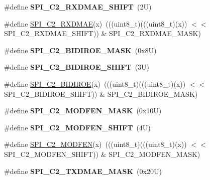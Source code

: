 \begin{DoxyCompactItemize}
\#define {\bfseries S\+P\+I\+\_\+\+C2\+\_\+\+R\+X\+D\+M\+A\+E\+\_\+\+S\+H\+I\+FT}~(2\+U)
\item 
\#define \mbox{\hyperlink{group___s_p_i___register___masks_ga593b17fd6c4f229cd7337e8bfd01b7f7}{S\+P\+I\+\_\+\+C2\+\_\+\+R\+X\+D\+M\+AE}}(x)~(((uint8\+\_\+t)(((uint8\+\_\+t)(x)) $<$$<$ S\+P\+I\+\_\+\+C2\+\_\+\+R\+X\+D\+M\+A\+E\+\_\+\+S\+H\+I\+FT)) \& S\+P\+I\+\_\+\+C2\+\_\+\+R\+X\+D\+M\+A\+E\+\_\+\+M\+A\+SK)
\item 
\mbox{\label{group___s_p_i___register___masks_gab4fb07392c6e708f3950587b02109f2f}} 
\#define {\bfseries S\+P\+I\+\_\+\+C2\+\_\+\+B\+I\+D\+I\+R\+O\+E\+\_\+\+M\+A\+SK}~(0x8\+U)
\item 
\mbox{\label{group___s_p_i___register___masks_ga228238321389e2344fa3c837fe55492e}} 
\#define {\bfseries S\+P\+I\+\_\+\+C2\+\_\+\+B\+I\+D\+I\+R\+O\+E\+\_\+\+S\+H\+I\+FT}~(3\+U)
\item 
\#define \mbox{\hyperlink{group___s_p_i___register___masks_gade24e99dbb59a98d2fcb0a3805fd4f57}{S\+P\+I\+\_\+\+C2\+\_\+\+B\+I\+D\+I\+R\+OE}}(x)~(((uint8\+\_\+t)(((uint8\+\_\+t)(x)) $<$$<$ S\+P\+I\+\_\+\+C2\+\_\+\+B\+I\+D\+I\+R\+O\+E\+\_\+\+S\+H\+I\+FT)) \& S\+P\+I\+\_\+\+C2\+\_\+\+B\+I\+D\+I\+R\+O\+E\+\_\+\+M\+A\+SK)
\item 
\mbox{\label{group___s_p_i___register___masks_ga447f4723c0ee7499e14bea6cd0c8d3ac}} 
\#define {\bfseries S\+P\+I\+\_\+\+C2\+\_\+\+M\+O\+D\+F\+E\+N\+\_\+\+M\+A\+SK}~(0x10\+U)
\item 
\mbox{\label{group___s_p_i___register___masks_ga7e2e1a75667ba2896d6056f5f886dec5}} 
\#define {\bfseries S\+P\+I\+\_\+\+C2\+\_\+\+M\+O\+D\+F\+E\+N\+\_\+\+S\+H\+I\+FT}~(4\+U)
\item 
\#define \mbox{\hyperlink{group___s_p_i___register___masks_ga5f1a8a79e0efec3bb74f71edb629d04d}{S\+P\+I\+\_\+\+C2\+\_\+\+M\+O\+D\+F\+EN}}(x)~(((uint8\+\_\+t)(((uint8\+\_\+t)(x)) $<$$<$ S\+P\+I\+\_\+\+C2\+\_\+\+M\+O\+D\+F\+E\+N\+\_\+\+S\+H\+I\+FT)) \& S\+P\+I\+\_\+\+C2\+\_\+\+M\+O\+D\+F\+E\+N\+\_\+\+M\+A\+SK)
\item 
\mbox{\label{group___s_p_i___register___masks_ga847c4ae3f2f0aed59df609ca39afb483}} 
\#define {\bfseries S\+P\+I\+\_\+\+C2\+\_\+\+T\+X\+D\+M\+A\+E\+\_\+\+M\+A\+SK}~(0x20\+U)
$$
\end{DoxyCompactItemize}
